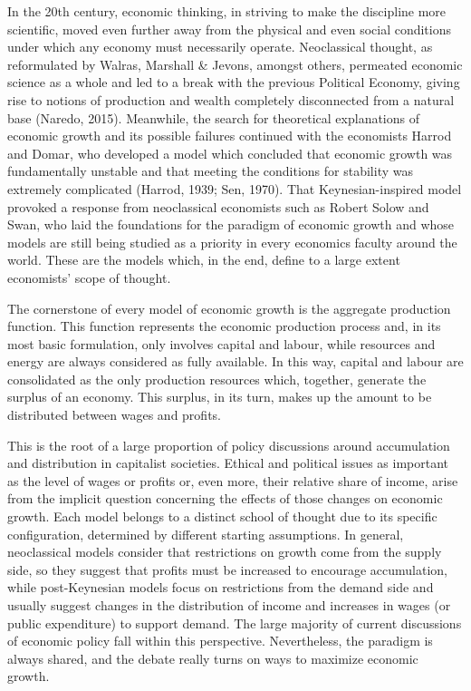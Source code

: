 \documentclass[
]{book}
\begin{document}
In the 20th century, economic thinking, in striving to make the discipline more scientific, moved even further away from the physical and even social conditions under which any economy must necessarily operate. Neoclassical thought, as reformulated by Walras, Marshall \& Jevons, amongst others, permeated economic science as a whole and led to a break with the previous Political Economy, giving rise to notions of production and wealth completely disconnected from a natural base (Naredo, 2015). Meanwhile, the search for theoretical explanations of economic growth and its possible failures continued with the economists Harrod and Domar, who developed a model which concluded that economic growth was fundamentally unstable and that meeting the conditions for stability was extremely complicated (Harrod, 1939; Sen, 1970). That Keynesian-inspired model provoked a response from neoclassical economists such as Robert Solow and Swan, who laid the foundations for the paradigm of economic growth and whose models are still being studied as a priority in every economics faculty around the world. These are the models which, in the end, define to a large extent economists' scope of thought.

The cornerstone of every model of economic growth is the aggregate production function. This function represents the economic production process and, in its most basic formulation, only involves capital and labour, while resources and energy are always considered as fully available. In this way, capital and labour are consolidated as the only production resources which, together, generate the surplus of an economy. This surplus, in its turn, makes up the amount to be distributed between wages and profits.

This is the root of a large proportion of policy discussions around accumulation and distribution in capitalist societies. Ethical and political issues as important as the level of wages or profits or, even more, their relative share of income, arise from the implicit question concerning the effects of those changes on economic growth. Each model belongs to a distinct school of thought due to its specific configuration, determined by different starting assumptions. In general, neoclassical models consider that restrictions on growth come from the supply side, so they suggest that profits must be increased to encourage accumulation, while post-Keynesian models focus on restrictions from the demand side and usually suggest changes in the distribution of income and increases in wages (or public expenditure) to support demand. The large majority of current discussions of economic policy fall within this perspective. Nevertheless, the paradigm is always shared, and the debate really turns on ways to maximize economic growth.
\end{document}
